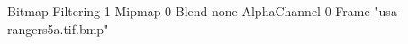 {Bitmap
	{Filtering 1}
	{Mipmap 0}
	{Blend none}
	{AlphaChannel 0}
	{Frame "usa-rangers5a.tif.bmp"}
}
